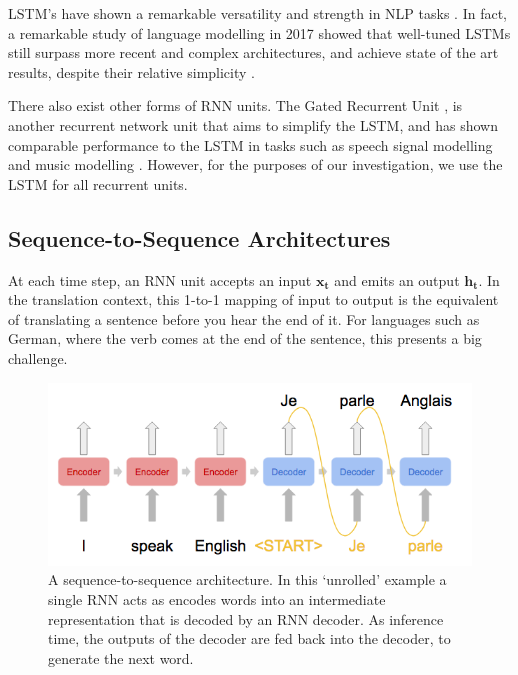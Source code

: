 LSTM's have shown a remarkable versatility and strength in NLP tasks \citep{young_recent_2017}. In fact, a remarkable study of language modelling in 2017 showed that well-tuned LSTMs still surpass more recent and complex architectures, and achieve state of the art results, despite their relative simplicity \citep{melis_state_2017}.

There also exist other forms of RNN units. The Gated Recurrent Unit \citep{cho_properties_2014}, is another recurrent network unit that aims to simplify the LSTM, and has shown comparable performance to the LSTM in tasks such as speech signal modelling and music modelling \citep{chung_empirical_2014}.
However, for the purposes of our investigation, we use the LSTM for all recurrent units.


\subsection{Sequence-to-Sequence Architectures} %
\label{sub:sequence_to_sequence_architectures}

At each time step, an RNN unit accepts an input $\mathbf{x_t}$ and emits an output $\mathbf{h_t}$. In the translation context, this 1-to-1 mapping of input to output is the equivalent of translating a sentence before you hear the end of it. For languages such as German, where the verb comes at the end of the sentence, this presents a big challenge.

\begin{figure}[tb]
    \centering
    \includegraphics[width=\linewidth]{ModelPics/seq2seq.png}
    \caption{A sequence-to-sequence architecture. In this `unrolled' example a single RNN acts as encodes words into an intermediate representation that is decoded by an RNN decoder. As inference time, the outputs of the decoder are fed back into the decoder, to generate the next word.}
    \label{fig:seqtoseq}
\end{figure}


